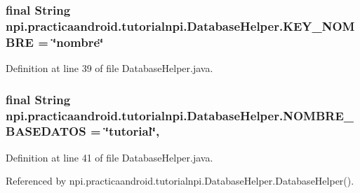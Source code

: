 \hypertarget{classnpi_1_1practicaandroid_1_1tutorialnpi_1_1_database_helper_a4df448dc8b88288d8dcd5096e9c93de6}{
\subsubsection[{K\-E\-Y\-\_\-\-N\-O\-M\-B\-R\-E}]{\setlength{\rightskip}{0pt plus 5cm}final String npi.\-practicaandroid.\-tutorialnpi.\-Database\-Helper.\-K\-E\-Y\-\_\-\-N\-O\-M\-B\-R\-E = \char`\"{}nombre\char`\"{}\hspace{0.3cm}{\ttfamily [static]}}}\label{classnpi_1_1practicaandroid_1_1tutorialnpi_1_1_database_helper_a4df448dc8b88288d8dcd5096e9c93de6}


Definition at line 39 of file Database\-Helper.\-java.

\hypertarget{classnpi_1_1practicaandroid_1_1tutorialnpi_1_1_database_helper_adae617106c904c3f532092172de81bb9}{
\subsubsection[{N\-O\-M\-B\-R\-E\-\_\-\-B\-A\-S\-E\-D\-A\-T\-O\-S}]{\setlength{\rightskip}{0pt plus 5cm}final String npi.\-practicaandroid.\-tutorialnpi.\-Database\-Helper.\-N\-O\-M\-B\-R\-E\-\_\-\-B\-A\-S\-E\-D\-A\-T\-O\-S = \char`\"{}tutorial\char`\"{}\hspace{0.3cm}{\ttfamily [static]}, {\ttfamily [private]}}}\label{classnpi_1_1practicaandroid_1_1tutorialnpi_1_1_database_helper_adae617106c904c3f532092172de81bb9}


Definition at line 41 of file Database\-Helper.\-java.



Referenced by npi.\-practicaandroid.\-tutorialnpi.\-Database\-Helper.\-Database\-Helper().

